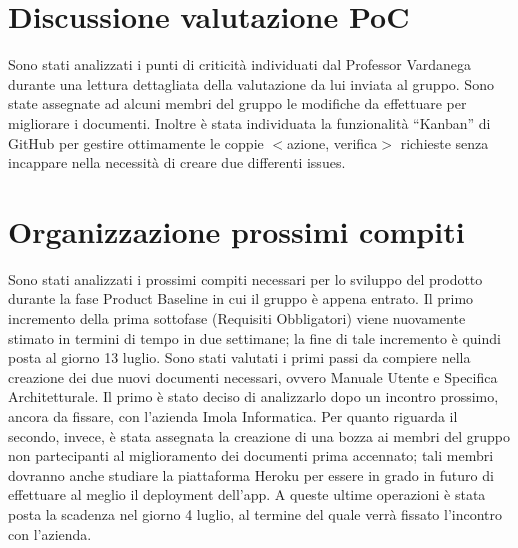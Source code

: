 \section{Discussione valutazione PoC}
Sono stati analizzati i punti di criticità individuati dal Professor Vardanega durante una lettura dettagliata della 
valutazione da lui inviata al gruppo. Sono state assegnate ad alcuni membri del gruppo le modifiche da effettuare per 
migliorare i documenti. Inoltre è stata individuata la funzionalità ``Kanban'' di GitHub per gestire ottimamente le 
coppie $<$azione, verifica$>$ richieste senza incappare nella necessità di creare due differenti issues.

\section{Organizzazione prossimi compiti}
Sono stati analizzati i prossimi compiti necessari per lo sviluppo del prodotto durante la fase Product Baseline in cui 
il gruppo è appena entrato. Il primo incremento della prima sottofase (Requisiti Obbligatori) viene nuovamente stimato in 
termini di tempo in due settimane; la fine di tale incremento è quindi posta al giorno 13 luglio. 
Sono stati valutati i primi passi da compiere nella creazione dei due nuovi documenti necessari, ovvero Manuale Utente e 
Specifica Architetturale. Il primo è stato deciso di analizzarlo dopo un incontro prossimo, ancora da fissare, con 
l'azienda Imola Informatica. Per quanto riguarda il secondo, invece, è stata assegnata la creazione di una bozza ai 
membri del gruppo non partecipanti al miglioramento dei documenti prima accennato; tali membri dovranno anche studiare 
la piattaforma Heroku per essere in grado in futuro di effettuare al meglio il deployment dell'app. A queste ultime 
operazioni è stata posta la scadenza nel giorno 4 luglio, al termine del quale verrà fissato l'incontro con l'azienda.

\newpage